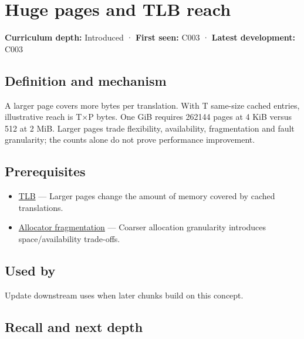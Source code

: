 \hypertarget{appendix-ce688d1acdab}{}\label{referencestart:appendix-ce688d1acdab}
\section{Huge pages and TLB reach}\label{appendix-ce688d1acdab-huge-pages-and-tlb-reach}

\textbf{Curriculum depth:} Introduced · \textbf{First seen:} C003 · \textbf{Latest development:} C003

\begin{allmightroledefinition}

\subsection{Definition and mechanism}\label{appendix-ce688d1acdab-definition-and-mechanism}

A larger page covers more bytes per translation. With T same-size cached entries, illustrative reach is T×P bytes. One GiB requires 262144 pages at 4 KiB versus 512 at 2 MiB. Larger pages trade flexibility, availability, fragmentation and fault granularity; the counts alone do not prove performance improvement.

\end{allmightroledefinition}

\subsection{Prerequisites}\label{appendix-ce688d1acdab-prerequisites}

\begin{itemize}
\tightlist
\item
  \hyperref[appendix-7a2d9c5ce511]{TLB} --- Larger pages change the amount of memory covered by cached translations.
\item
  \hyperref[appendix-a7c50686d81f]{Allocator fragmentation} --- Coarser allocation granularity introduces space/availability trade-offs.
\end{itemize}

\subsection{Used by}\label{appendix-ce688d1acdab-used-by}

Update downstream uses when later chunks build on this concept.

\subsection{Recall and next depth}\label{appendix-ce688d1acdab-recall-and-next-depth}

